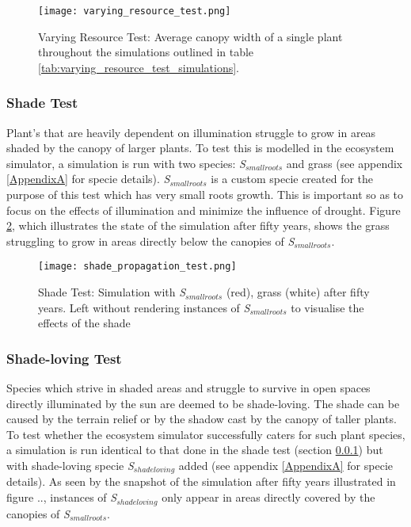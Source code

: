 \begin{figure}
\center
	\texttt{[image: varying\_resource\_test.png]}
	\caption{ Varying Resource Test: Average canopy width of a single plant throughout the simulations outlined in table \ref{tab:varying_resource_test_simulations}. }
	\label{fig:varying_resource_test}
\end{figure}

\subsubsection{Shade Test} \label{subsubsec:shade_test}

Plant's that are heavily dependent on illumination struggle to grow in areas shaded by the canopy of larger plants. To test this is modelled in the ecosystem simulator, a simulation is run with two species: \textit{S$_{smallroots}$} and grass (see appendix \ref{AppendixA} for specie details).  \textit{S$_{smallroots}$} is a custom specie created for the purpose of this test which has very small roots growth. This is important so as to focus on the effects of illumination and minimize the influence of drought. Figure \ref{fig:shade_test}, which illustrates the state of the simulation after fifty years, shows the grass struggling to grow in areas directly below the canopies of \textit{S$_{smallroots}$}.

\begin{figure}
\center
	\texttt{[image: shade\_propagation\_test.png]}
	\caption{ Shade Test: Simulation with \textit{S$_{smallroots}$} (red), grass (white) after fifty years. Left without rendering instances of \textit{S$_{smallroots}$} to visualise the effects of the shade}
	\label{fig:shade_test}
\end{figure}

\subsubsection{Shade-loving Test} \label{subsubsec:shade_loving_test}

Species which strive in shaded areas and struggle to survive in open spaces directly illuminated by the sun are deemed to be shade-loving. The shade can be caused by the terrain relief or by the shadow cast by the canopy of taller plants. To test whether the ecosystem simulator successfully caters for such plant species, a simulation is run identical to that done in the shade test (section \ref{subsubsec:shade_test}) but with shade-loving specie \textit{S$_{shadeloving}$} added (see appendix \ref{AppendixA} for specie details). As seen by the snapshot of the simulation after fifty years illustrated in figure .., instances of \textit{S$_{shadeloving}$} only appear in areas directly covered by the canopies of \textit{S$_{smallroots}$}.

